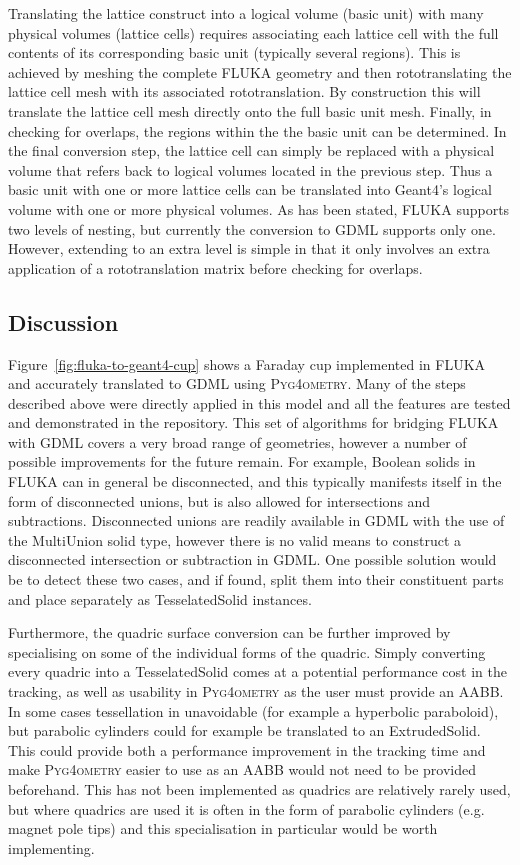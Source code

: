 \documentclass[final,5p,times,twocolumn]{elsarticle}
\newcommand{\PYGEOMETRY}{\textsc{Pyg4ometry}}
\begin{document}
Translating the lattice construct into a logical volume (basic unit) with many
physical volumes (lattice cells) requires associating each
lattice cell with the full contents of its corresponding basic unit
(typically several regions). This is achieved by meshing the complete
FLUKA geometry and then rototranslating the lattice cell mesh with
its associated rototranslation. By construction this will translate the
lattice cell mesh directly onto the full basic unit mesh. Finally,
in checking for overlaps, the regions within the the basic unit can be
determined. In the final conversion step, the lattice cell can
simply be replaced with a physical volume that refers back to logical
volumes located in the previous step. Thus a basic unit with one or more lattice cells can
be translated into Geant4's logical volume with one or more physical volumes. As has been stated,
FLUKA supports two levels of nesting, but currently the conversion to GDML
supports only one. However, extending to an extra level is simple in that
it only involves an extra application of a rototranslation matrix before
checking for overlaps.

\subsection{Discussion}

Figure~\ref{fig:fluka-to-geant4-cup} shows a Faraday cup implemented in
FLUKA and accurately translated to GDML using \PYGEOMETRY{}.  Many of the
steps described above were directly applied in this model and all the
features are tested and demonstrated in the repository.  This set of
algorithms for bridging FLUKA with GDML covers a very broad range of
geometries, however a number of possible improvements for the future
remain.  For example, Boolean solids in FLUKA can in general be
disconnected, and this typically manifests itself in the form of
disconnected unions, but is also allowed for intersections and
subtractions.  Disconnected unions are readily available in GDML with the
use of the MultiUnion solid type, however there is no valid means to
construct a disconnected intersection or subtraction in GDML.  One possible
solution would be to detect these two cases, and if found, split them into
their constituent parts and place separately as TesselatedSolid instances.

Furthermore, the quadric surface conversion can be further improved by
specialising on some of the individual forms of the quadric.  Simply
converting every quadric into a TesselatedSolid comes at a potential
performance cost in the tracking, as well as usability in \PYGEOMETRY{} as the
user must provide an AABB.  In some cases tessellation in unavoidable (for
example a hyperbolic paraboloid), but parabolic cylinders could for example
be translated to an ExtrudedSolid.  This could provide both a performance
improvement in the tracking time and make \PYGEOMETRY{} easier to use as an
AABB would not need to be provided beforehand.  This has not been
implemented as quadrics are relatively rarely used, but where quadrics are
used it is often in the form of parabolic cylinders (e.g. magnet pole tips) and this
specialisation in particular would be worth implementing.
\end{document}
